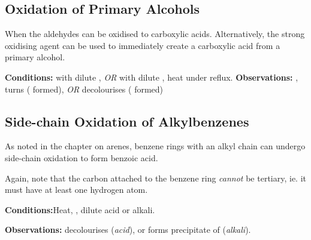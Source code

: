 		\subsection{Oxidation of Primary Alcohols}

			When the aldehydes can be oxidised to carboxylic acids. Alternatively, the strong oxidising agent  can be used to
			immediately create a carboxylic acid from a primary alcohol.

			\vspace{1.5em}
			\vbox{\textbf{Conditions:}	\tabto{35mm} with dilute , \textit{OR}  with dilute ,
										\tabto{35mm}heat under reflux.}
			\vspace{0.75em}
			\vbox{\textbf{Observations:}\tabto{35mm} , turns 
													( formed), \textit{OR}
										\tabto{35mm}  decolourises ( formed)}





		\pagebreak
		\subsection{Side-chain Oxidation of Alkylbenzenes}

			As noted in the chapter on arenes, benzene rings with an alkyl chain can undergo side-chain oxidation to form benzoic acid.

			Again, note that the carbon attached to the benzene ring \textit{cannot} be tertiary, ie. it must have at least one hydrogen atom.


			\vspace{1.5em}

			\vbox{\textbf{Conditions:}\tabto{35mm}Heat, , dilute acid or alkali.}

			\vspace{0.75em}
			\vbox{\textbf{Observations:}\tabto{35mm}  decolourises (\textit{acid}), or
										\tabto{35mm}forms  precipitate of  (\textit{alkali}).}

